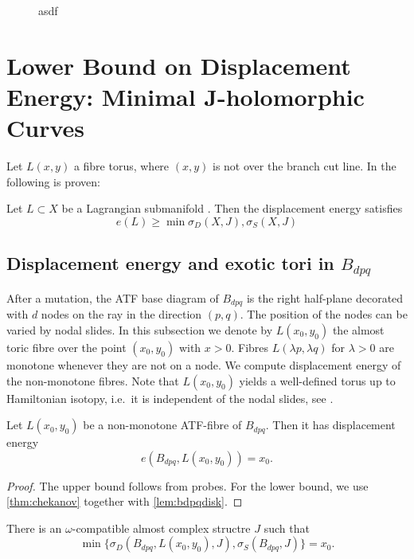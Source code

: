 \documentclass[12pt,a4paper,draft]{scrartcl}
\begin{document}
\begin{figure}
  \centering
  \caption{asdf}
  \label{fig:homology_generating_discs}
\end{figure}

\section{Lower Bound on Displacement Energy: Minimal J-holomorphic Curves}

Let \(L(x,y)\) a fibre torus, where \((x,y)\) is not over the branch cut line. In \cite{chekanov1998} the following is proven:

\begin{theorem}
  \label{thm:chekanov}
  Let \(L ⊂ X\) be a Lagrangian submanifold . Then the displacement energy satisfies
  \[e(L) ≥ \min{σ_D(X,J),σ_S(X,J)}\] 
\end{theorem}

\subsection{Displacement energy and exotic tori in \texorpdfstring{\(B_{dpq}\)}{Bdpq}}

After a mutation, the ATF base diagram of $B_{dpq}$ is the right half-plane decorated with $d$ nodes on the ray in the direction $(p,q)$. The position of the nodes can be varied by nodal slides. In this subsection we denote by $L(x_0,y_0)$ the almost toric fibre over the point $(x_0,y_0)$ with $x > 0$. Fibres $L(\lambda p,\lambda q)$ for $\lambda > 0$ are monotone whenever they are not on a node. We compute displacement energy of the non-monotone fibres. Note that $L(x_0,y_0)$ yields a well-defined torus up to Hamiltonian isotopy, i.e.\ it is independent of the nodal slides, see . 

\begin{proposition}
\label{prop:bdpq}
Let $L(x_0,y_0)$ be a non-monotone ATF-fibre of $B_{dpq}$. Then it has displacement energy
\[e(B_{dpq}, L(x_0,y_0)) = x_0 .\]
\end{proposition}

\begin{proof}
    The upper bound follows from probes. For the lower bound, we use \cref{thm:chekanov} together with \cref{lem:bdpqdisk}. 
\end{proof}

\begin{lemma}
\label{lem:bdpqdisk}
    There is an $\omega$-compatible almost complex structre $J$ such that 
    \[\min \{\sigma_D(B_{dpq}, L(x_0,y_0), J) , \sigma_S(B_{dpq}, J)\} = x_0. \]  
\end{lemma}
\end{document}
